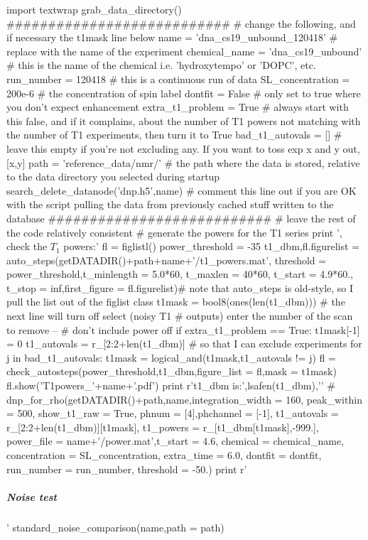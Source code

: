 \documentclass[10pt]{book}
\begin{document}
\begin{python}
import textwrap
grab_data_directory()
###########################{{{
# change the following, and if necessary the t1mask line below
name = 'dna_cs19_unbound_120418' # replace with the name of the experiment
chemical_name = 'dna_cs19_unbound' # this is the name of the chemical i.e. 'hydroxytempo' or 'DOPC', etc.
run_number = 120418 # this is a continuous run of data
SL_concentration = 200e-6 # the concentration of spin label
dontfit = False # only set to true where you don't expect enhancement
extra_t1_problem = True # always start with this false, and if it complains, about the number of T1 powers not matching with the number of T1 experiments, then turn it to True
bad_t1_autovals = [] # leave this empty if you're not excluding any. If you want to toss exp x and y out, [x,y]
path = 'reference_data/nmr/' # the path where the data is stored, relative to the data directory you selected during startup
search_delete_datanode('dnp.h5',name) # comment this line out if you are OK with the script pulling the data from previously cached stuff written to the database
###########################}}}
# leave the rest of the code relatively consistent
#{{{ generate the powers for the T1 series
print '\n\nNext, check the $T_1$ powers:\n\n'
fl = figlistl()
power_threshold = -35
t1_dbm,fl.figurelist = auto_steps(getDATADIR()+path+name+'/t1_powers.mat',
    threshold = power_threshold,t_minlength = 5.0*60,
    t_maxlen = 40*60, t_start = 4.9*60.,
    t_stop = inf,first_figure = fl.figurelist)# note that auto_steps is old-style, so I pull the list out of the figlist class
t1mask = bool8(ones(len(t1_dbm)))
# the next line will turn off select (noisy T1
# outputs) enter the number of the scan to remove --
# don't include power off
if extra_t1_problem == True:
    t1mask[-1] = 0
t1_autovals = r_[2:2+len(t1_dbm)] # so that I can exclude experiments
for j in bad_t1_autovals:
    t1mask = logical_and(t1mask,t1_autovals != j)
fl = check_autosteps(power_threshold,t1_dbm,figure_list = fl,mask = t1mask)
fl.show('T1powers_'+name+'.pdf')
print r't1\_dbm is:',lsafen(t1_dbm),'\n\n'
#}}}
dnp_for_rho(getDATADIR()+path,name,integration_width = 160,
        peak_within = 500, show_t1_raw = True,
        phnum = [4],phchannel = [-1],
        t1_autovals = r_[2:2+len(t1_dbm)][t1mask],
        t1_powers = r_[t1_dbm[t1mask],-999.],
        power_file = name+'/power.mat',t_start = 4.6,
        chemical = chemical_name,
        concentration = SL_concentration,
        extra_time = 6.0,
        dontfit = dontfit,
        run_number = run_number,
        threshold = -50.)
print r'\subparagraph{Noise test}'
standard_noise_comparison(name,path = path)
\end{python}
\end{document}
